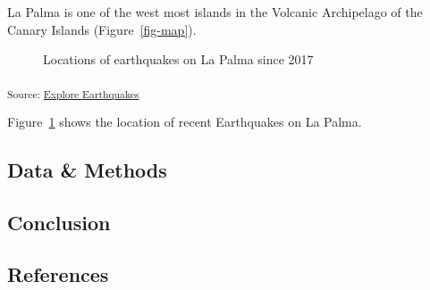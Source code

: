 \documentclass[
  man,
  longtable,
  nolmodern,
  notxfonts,
  notimes,
  colorlinks=true,linkcolor=blue,citecolor=blue,urlcolor=blue]{apa7}
\begin{document}
La Palma is one of the west most islands in the Volcanic Archipelago of
the Canary Islands (Figure~\ref{fig-map}).

\begin{figure}[H]

\caption{\label{fig-spatial-plot}Locations of earthquakes on La Palma
since 2017}


\end{figure}%

\textsubscript{Source:
\href{https://kbmcgowan.github.io/play-manuscript/notebooks/explore-earthquakes.qmd.html\#cell-fig-spatial-plot}{Explore
Earthquakes}}

Figure~\ref{fig-spatial-plot} shows the location of recent Earthquakes
on La Palma.

\subsection{Data \& Methods}\label{sec-data-methods}

\subsection{Conclusion}\label{conclusion}

\subsection*{References}\label{references}
\end{document}
